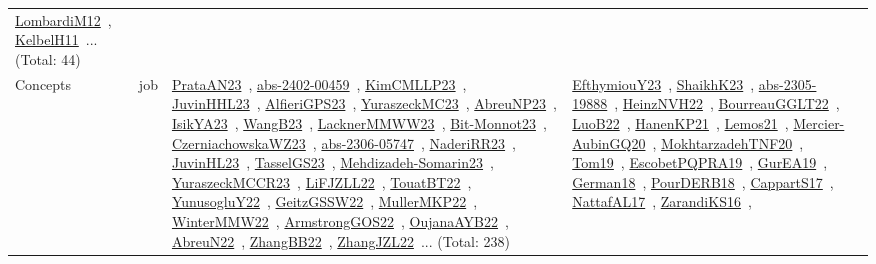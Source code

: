 {\begin{longtable}{lp{3cm}>{\raggedright\arraybackslash}p{6cm}>{\raggedright\arraybackslash}p{6cm}>{\raggedright\arraybackslash}p{8cm}}
\href{works/LombardiM12.pdf}{LombardiM12}~\cite{LombardiM12}, \href{works/KelbelH11.pdf}{KelbelH11}~\cite{KelbelH11}... (Total: 44)\\
Concepts & job & \href{works/PrataAN23.pdf}{PrataAN23}~\cite{PrataAN23}, \href{works/abs-2402-00459.pdf}{abs-2402-00459}~\cite{abs-2402-00459}, \href{works/KimCMLLP23.pdf}{KimCMLLP23}~\cite{KimCMLLP23}, \href{works/JuvinHHL23.pdf}{JuvinHHL23}~\cite{JuvinHHL23}, \href{works/AlfieriGPS23.pdf}{AlfieriGPS23}~\cite{AlfieriGPS23}, \href{works/YuraszeckMC23.pdf}{YuraszeckMC23}~\cite{YuraszeckMC23}, \href{works/AbreuNP23.pdf}{AbreuNP23}~\cite{AbreuNP23}, \href{works/IsikYA23.pdf}{IsikYA23}~\cite{IsikYA23}, \href{works/WangB23.pdf}{WangB23}~\cite{WangB23}, \href{works/LacknerMMWW23.pdf}{LacknerMMWW23}~\cite{LacknerMMWW23}, \href{works/Bit-Monnot23.pdf}{Bit-Monnot23}~\cite{Bit-Monnot23}, \href{works/CzerniachowskaWZ23.pdf}{CzerniachowskaWZ23}~\cite{CzerniachowskaWZ23}, \href{works/abs-2306-05747.pdf}{abs-2306-05747}~\cite{abs-2306-05747}, \href{works/NaderiRR23.pdf}{NaderiRR23}~\cite{NaderiRR23}, \href{works/JuvinHL23.pdf}{JuvinHL23}~\cite{JuvinHL23}, \href{works/TasselGS23.pdf}{TasselGS23}~\cite{TasselGS23}, \href{works/Mehdizadeh-Somarin23.pdf}{Mehdizadeh-Somarin23}~\cite{Mehdizadeh-Somarin23}, \href{works/YuraszeckMCCR23.pdf}{YuraszeckMCCR23}~\cite{YuraszeckMCCR23}, \href{works/LiFJZLL22.pdf}{LiFJZLL22}~\cite{LiFJZLL22}, \href{works/TouatBT22.pdf}{TouatBT22}~\cite{TouatBT22}, \href{works/YunusogluY22.pdf}{YunusogluY22}~\cite{YunusogluY22}, \href{works/GeitzGSSW22.pdf}{GeitzGSSW22}~\cite{GeitzGSSW22}, \href{works/MullerMKP22.pdf}{MullerMKP22}~\cite{MullerMKP22}, \href{works/WinterMMW22.pdf}{WinterMMW22}~\cite{WinterMMW22}, \href{works/ArmstrongGOS22.pdf}{ArmstrongGOS22}~\cite{ArmstrongGOS22}, \href{works/OujanaAYB22.pdf}{OujanaAYB22}~\cite{OujanaAYB22}, \href{works/AbreuN22.pdf}{AbreuN22}~\cite{AbreuN22}, \href{works/ZhangBB22.pdf}{ZhangBB22}~\cite{ZhangBB22}, \href{works/ZhangJZL22.pdf}{ZhangJZL22}~\cite{ZhangJZL22}... (Total: 238) & \href{works/EfthymiouY23.pdf}{EfthymiouY23}~\cite{EfthymiouY23}, \href{works/ShaikhK23.pdf}{ShaikhK23}~\cite{ShaikhK23}, \href{works/abs-2305-19888.pdf}{abs-2305-19888}~\cite{abs-2305-19888}, \href{works/HeinzNVH22.pdf}{HeinzNVH22}~\cite{HeinzNVH22}, \href{works/BourreauGGLT22.pdf}{BourreauGGLT22}~\cite{BourreauGGLT22}, \href{works/LuoB22.pdf}{LuoB22}~\cite{LuoB22}, \href{works/HanenKP21.pdf}{HanenKP21}~\cite{HanenKP21}, \href{works/Lemos21.pdf}{Lemos21}~\cite{Lemos21}, \href{works/Mercier-AubinGQ20.pdf}{Mercier-AubinGQ20}~\cite{Mercier-AubinGQ20}, \href{works/MokhtarzadehTNF20.pdf}{MokhtarzadehTNF20}~\cite{MokhtarzadehTNF20}, \href{works/Tom19.pdf}{Tom19}~\cite{Tom19}, \href{works/EscobetPQPRA19.pdf}{EscobetPQPRA19}~\cite{EscobetPQPRA19}, \href{works/GurEA19.pdf}{GurEA19}~\cite{GurEA19}, \href{works/German18.pdf}{German18}~\cite{German18}, \href{works/PourDERB18.pdf}{PourDERB18}~\cite{PourDERB18}, \href{works/CappartS17.pdf}{CappartS17}~\cite{CappartS17}, \href{works/NattafAL17.pdf}{NattafAL17}~\cite{NattafAL17}, \href{works/ZarandiKS16.pdf}{ZarandiKS16}~\cite{ZarandiKS16}, 
\end{longtable}}
